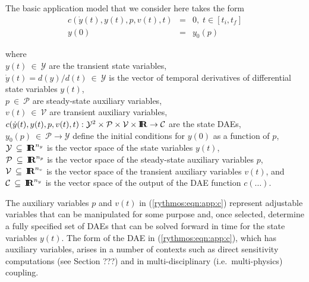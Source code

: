 \documentclass[pdf,ps2pdf,11pt]{SANDreport}
\begin{document}
The basic application model that we consider here takes the form
%
\begin{eqnarray}
c\left( \dot{y}(t), y(t), p, v(t), t \right) & = & 0,
\; t \in \left[ t_i, t_f \right] \label{rythmos:eqn:app:c} \\
y(0) & = & y_0(p) \label{rythmos:eqn:app:c:ic}
\end{eqnarray}
\begin{tabbing}
\hspace{4ex}where\hspace{1ex}\= \\
\>	$y(t) \:\in\:\mathcal{Y}$ are the transient state variables, \\
\>	$\dot{y}(t) = d(y)/d(t)\:\in\:\mathcal{Y}$ is the vector of temporal derivatives of differential state variables $y(t)$, \\
\>	$p \:\in\:\mathcal{P}$ are steady-state auxiliary variables, \\
\>	$v(t) \:\in\:\mathcal{V}$ are transient auxiliary variables, \\
\>	$c(\dot{y}(t), y(t), p, v(t), t) :
		\mathcal{Y}^2 \times \mathcal{P} \times \mathcal{V} \times \mbox{\textbf{I}}\hspace{-0.6ex}\mbox{\textbf{R}}
		\rightarrow \mathcal{C}$ are the state DAEs, \\
\>	$y_0(p) \:\in\:\mathcal{P} \rightarrow \mathcal{Y}$ define the initial conditions for $y(0)$ as a function of $p$, \\
\>	$\mathcal{Y} \:\subseteq\:\mbox{\textbf{I}}\hspace{-0.6ex}\mbox{\textbf{R}}^{n_y}$ is the vector space of the state variables $y(t)$, \\
\>	$\mathcal{P} \:\subseteq\:\mbox{\textbf{I}}\hspace{-0.6ex}\mbox{\textbf{R}}^{n_p}$ is the vector space of the steady-state auxiliary variables $p$, \\
\>	$\mathcal{V} \:\subseteq\:\mbox{\textbf{I}}\hspace{-0.6ex}\mbox{\textbf{R}}^{n_v}$ is the vector space of the transient auxiliary variables $v(t)$, and \\
\>	$\mathcal{C} \:\subseteq\:\mbox{\textbf{I}}\hspace{-0.6ex}\mbox{\textbf{R}}^{n_y}$ is the vector space of the output of the DAE function $c(\ldots)$.
\end{tabbing}

The auxiliary variables $p$ and $v(t)$ in (\ref{rythmos:eqn:app:c}) represent
adjustable variables that can be manipulated for some purpose and, once
selected, determine a fully specified set of DAEs that can be solved forward
in time for the state variables $y(t)$.  The form of the DAE in
(\ref{rythmos:eqn:app:c}), which has auxiliary variables, arises in a number
of contexts such as direct sensitivity computations (see Section ???) and in
multi-disciplinary (i.e.\ multi-physics) coupling.
\end{document}
